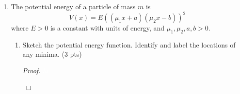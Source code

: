 \documentclass[../psets.tex]{subfiles}
\begin{document}
\begin{enumerate}
\begin{enumerate}
\begin{proof}
\begin{align*}
                &= \frac{\pi b\sqrt{mk}}{4bm\sqrt{k/m}}\\
                &= \frac{\pi}{4}
            \end{align*}
            Thus, since the ratio is less than one, \par\medskip
            Additionally, since there will always be a region near zero where the second particle is under a smaller magnitude of force than the first particle, the second particle will decelerate slower than the first one when $t$ is small. Thus, the second particle both travels further and gets farther away from the origin more quickly, implying that the first particle cannot catch up to it before both particles come to rest at their maximum distance from the origin. Therefore, the trajectories cross only  during each period, specifically during their passes by the origin (at the beginning and middle of the period).
        \end{proof}
    \end{enumerate}
    \item The potential energy of a particle of mass $m$ is
    \begin{equation*}
        V(x) = E((\mu_1x+a)(\mu_2x-b))^2
    \end{equation*}
    where $E>0$ is a constant with units of energy, and $\mu_1,\mu_2,a,b>0$.
    \begin{enumerate}
        \item Sketch the potential energy function. Identify and label the locations of any minima. (3 pts)
        \begin{proof}
            ${\color{white}hi}$
            \begin{center}
\end{center}
\end{proof}
\end{enumerate}
\end{enumerate}
\end{document}
